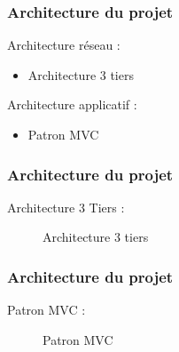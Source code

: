 \begin{frame}
  \frametitle{Architecture du projet}
	
  Architecture réseau :
      \begin{itemize}
        \item Architecture 3 tiers
      \end{itemize}
  Architecture applicatif :
      \begin{itemize}
        \item Patron MVC
      \end{itemize}
\end{frame}

\begin{frame}
  \frametitle{Architecture du projet}
  
  Architecture 3 Tiers :
  
  \begin{figure}[!h]
	\begin{center}
	
	\caption{\label{3tiers_schema} Architecture 3 tiers}
	\end{center}
  \end{figure}

\end{frame}




\begin{frame}
  \frametitle{Architecture du projet}
  
	Patron MVC :

  \begin{figure}[!h]
	\begin{center}
	
	\caption{\label{3tiers_schema} Patron MVC}
	\end{center}
  \end{figure}	
	
\end{frame}